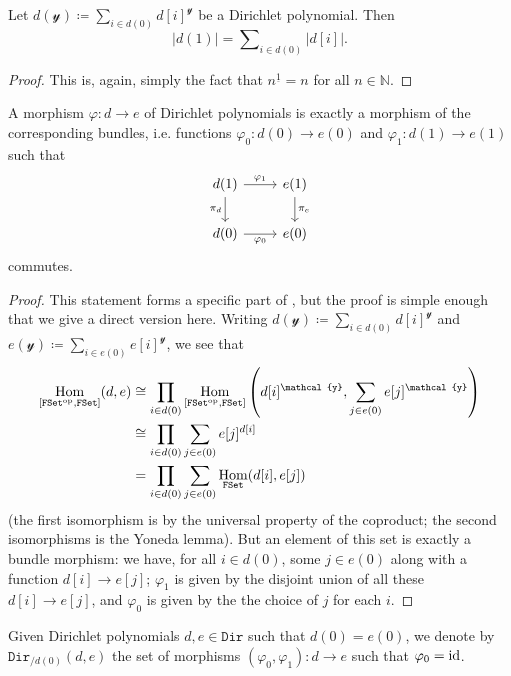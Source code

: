 \documentclass[11pt,fleqn]{article}
\newcommand{\yon}{\mathcal{y}}
\newcommand{\op}{^\textnormal{op}}
\newcommand{\id}{\textnormal{id}}
\newcommand{\cat}[1]{\mathtt{#1}}
\newcommand{\FSet}{\cat{FSet}}
\newcommand{\cDir}{\cat{Dir}}
\DeclareMathOperator{\Hom}{Hom}
\begin{document}
\begin{corollary}
\label{corollary:d0-and-d1-from-fibre-form}
  Let $d(\yon)\coloneqq\sum_{i\in d(0)} d[i]^\yon$ be a Dirichlet polynomial.
  Then
  \[
    |d(1)| = \sum\nolimits_{i\in d(0)} |d[i]|.
  \]
\end{corollary}

\begin{proof}
  This is, again, simply the fact that $n^{\underline{1}}=n$ for all $n\in\mathbb{N}$.
\end{proof}

\begin{lemma}
\label{lemma:morphism-of-dir-is-morphism-of-bund}
  A morphism $\varphi\colon d\to e$ of Dirichlet polynomials is exactly a morphism of the corresponding bundles, i.e. functions $\varphi_0\colon d(0)\to e(0)$ and $\varphi_1\colon d(1)\to e(1)$ such that
  \[
    \begin{tikzcd}
      d(1) \rar["\varphi_1"] \dar[swap,"\pi_d"]
      & e(1) \dar["\pi_e"]
    \\d(0) \rar[swap,"\varphi_0"]
      & e(0)
    \end{tikzcd}
  \]
  commutes.
\end{lemma}

\begin{proof}
  This statement forms a specific part of \cite[Theorem~4.6]{SM2020}, but the proof is simple enough that we give a direct version here.
  Writing $d(\yon)\coloneqq\sum_{i\in d(0)}d[i]^\yon$ and $e(\yon)\coloneqq\sum_{i\in e(0)}e[i]^\yon$, we see that
  \[
    \begin{aligned}
      \Hom_{[\FSet\op,\FSet]}(d,e)
      &\cong \prod_{i\in d(0)}\Hom_{[\FSet\op,\FSet]}\left(
        d[i]^\yon,
        \sum_{j\in e(0)}e[j]^\yon
      \right)
    \\&\cong \prod_{i\in d(0)}\sum_{j\in e(0)} e[j]^{d[i]}
    \\&= \prod_{i\in d(0)}\sum_{j\in e(0)} \Hom_{\FSet}(d[i],e[j])
    \end{aligned}
  \]
  (the first isomorphism is by the universal property of the coproduct;
  the second isomorphisms is the Yoneda lemma).
  But an element of this set is exactly a bundle morphism:
  we have, for all $i\in d(0)$, some $j\in e(0)$ along with a function $d[i]\to e[j]$;
  $\varphi_1$ is given by the disjoint union of all these $d[i]\to e[j]$, and $\varphi_0$ is given by the the choice of $j$ for each $i$.
\end{proof}

\begin{definition}
  Given Dirichlet polynomials $d,e\in\cDir$ such that $d(0)=e(0)$, we denote by $\cDir_{/d(0)}(d,e)$ the set of morphisms $(\varphi_0,\varphi_1)\colon d\to e$ such that $\varphi_0=\id$.
\end{definition}
\end{document}
